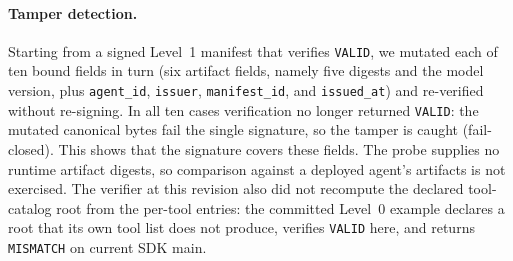 \paragraph{Tamper detection.}
Starting from a signed Level~1 manifest that verifies \texttt{VALID}, we mutated each
of ten bound fields in turn (six artifact fields, namely five digests and the model
version, plus \texttt{agent\_id}, \texttt{issuer}, \texttt{manifest\_id}, and
\texttt{issued\_at}) and re-verified without re-signing. In all ten cases
verification no longer returned \texttt{VALID}: the mutated canonical bytes fail the
single signature, so the tamper is caught (fail-closed). This shows that the
signature covers these fields. The probe supplies no runtime artifact digests, so
comparison against a deployed agent's artifacts is not exercised. The verifier at
this revision also did not recompute the declared tool-catalog root from the per-tool
entries: the committed Level~0 example declares a root that its own tool list does
not produce, verifies \texttt{VALID} here, and returns \texttt{MISMATCH} on current
SDK main.
